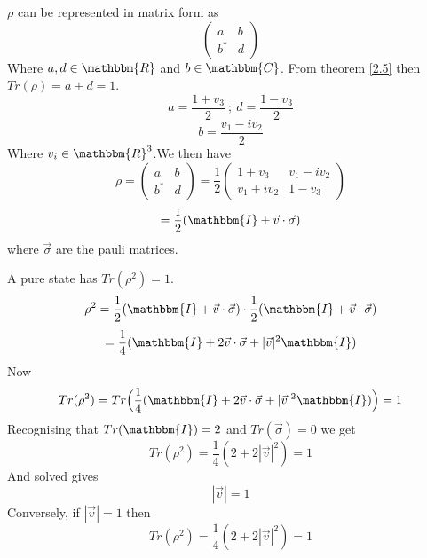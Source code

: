 \documentclass[12pt]{article}
\begin{document}
\begin{enumerate}
$\rho$ can be represented in matrix form as 
$$ \left(\begin{array}{cc} a & b \\ b^* & d\end{array}\right)$$
Where $a,d \in \mathbbm{R}$ and $b \in \mathbbm{C}$. From theorem \ref{2.5} then $Tr(\rho) = a + d = 1$. 
$$ a = \frac{1+v_3}{2} \ ; \ d = \frac{1 -v_3}{2} $$
$$ b = \frac{v_1 - iv_2}{2}$$
Where $v_i \in \mathbbm{R}^3$.We then have 
$$ \rho =  \left(\begin{array}{cc} a & b \\ b^* & d\end{array}\right) = \frac{1}{2}  \left(\begin{array}{cc} 1+v_3& v_1 - iv_2 \\ v_1 + iv_2 & 1-v_3 \end{array}\right) $$
$$ = \frac{1}{2} (\mathbbm{I} + \vec{v}\cdot \vec{\sigma}) $$
where $\vec{\sigma}$ are the pauli matrices. 


A pure state has $Tr(\rho^2) = 1$. 
$$ \rho^2 = \frac{1}{2} (\mathbbm{I} + \vec{v} \cdot \vec{\sigma}) \cdot \frac{1}{2} (\mathbbm{I} + \vec{v} \cdot \vec{\sigma}) $$
$$ = \frac{1}{4} ( \mathbbm{I} + 2 \vec{v} \cdot \vec{\sigma} + |\vec{v}|^2 \mathbbm{I}) $$
Now 
$$ Tr(\rho^2) = Tr \Big( \frac{1}{4} ( \mathbbm{I} + 2 \vec{v} \cdot \vec{\sigma} + |\vec{v}|^2 \mathbbm{I}) \Big) = 1$$
Recognising that $Tr(\mathbbm{I}) = 2$ and $Tr(\vec{\sigma}) = 0 $ we get 
$$ Tr(\rho^2) = \frac{1}{4}(2+2|\vec{v}|^2 ) = 1 $$
And solved gives 
$$ |\vec{v}| = 1 $$ 
Conversely, if $|\vec{v}| = 1$ then
$$ Tr(\rho^2) =  \frac{1}{4}(2+2|\vec{v}|^2 ) = 1 $$



\end{enumerate}
\end{document}

